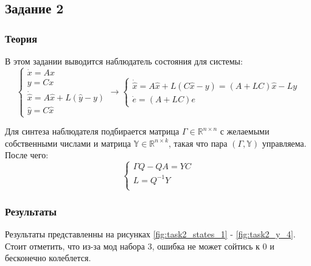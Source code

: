 \subsection{Задание 2}
\subsubsection{Теория}
В этом задании выводится наблюдатель состояния для системы:
\[
        \begin{cases}
                \dot{x} = A x \\
                y = C x \\
                \dot{\hat{x}} = A \hat{x} + L(\hat{y} - y) \\
                \hat{y} = C \hat{x}
        \end{cases} \rightarrow
        \begin{cases}
            \dot{\hat{x}} = A \hat{x} + L(C \hat{x} - y) = (A + LC )\hat{x} - Ly \\
            \dot{e} = (A + LC)e
            
    \end{cases}
\]

Для синтеза наблюдателя подбирается матрица \(\Gamma \in \mathds{R}^{n \times n}\) с желаемыми собственными числами и матрица \(\mathds{Y} \in \mathds{R}^{n \times k}\), такая что пара \((\Gamma, \mathds{Y})\) управляема. После чего:
\[
    \begin{cases}
        \Gamma Q - QA = YC \\
        L = Q^{-1}Y \\
    \end{cases}
\]




\subsubsection{Результаты}
Результаты представленны на рисунках \ref{fig:task2_states_1} - \ref{fig:task2_y_4}. Стоит отметить, что из-за мод набора 3, ошибка не может сойтись к 0 и бесконечно колеблется.


